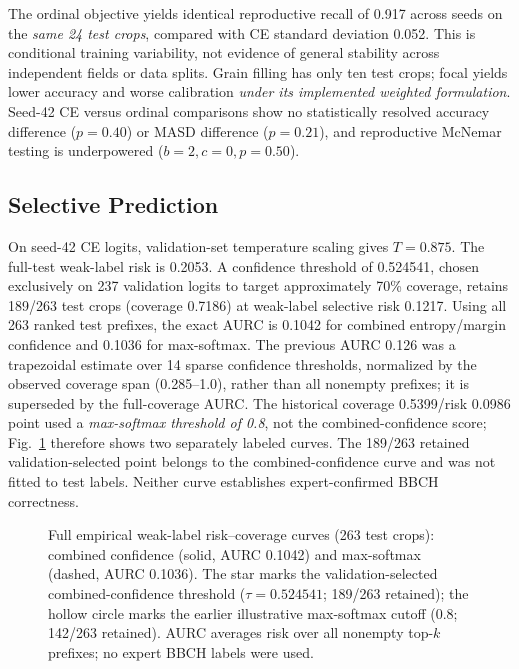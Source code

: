 \documentclass[conference,a4paper]{IEEEtran}
\begin{document}
The ordinal objective yields identical reproductive recall of 0.917 across seeds on the \emph{same 24 test crops}, compared with CE standard deviation 0.052. This is conditional training variability, not evidence of general stability across independent fields or data splits. Grain filling has only ten test crops; focal yields lower accuracy and worse calibration \emph{under its implemented weighted formulation}. Seed-42 CE versus ordinal comparisons show no statistically resolved accuracy difference ($p=0.40$) or MASD difference ($p=0.21$), and reproductive McNemar testing is underpowered ($b=2,c=0,p=0.50$).

\subsection{Selective Prediction}

On seed-42 CE logits, validation-set temperature scaling gives $T=0.875$. The full-test weak-label risk is 0.2053. A confidence threshold of 0.524541, chosen exclusively on 237 validation logits to target approximately 70\% coverage, retains 189/263 test crops (coverage 0.7186) at weak-label selective risk 0.1217. Using all 263 ranked test prefixes, the exact AURC is 0.1042 for combined entropy/margin confidence and 0.1036 for max-softmax. The previous AURC 0.126 was a trapezoidal estimate over 14 sparse confidence thresholds, normalized by the observed coverage span (0.285--1.0), rather than all nonempty prefixes; it is superseded by the full-coverage AURC. The historical coverage 0.5399/risk 0.0986 point used a \emph{max-softmax threshold of 0.8}, not the combined-confidence score; Fig.~\ref{fig:risk-coverage} therefore shows two separately labeled curves. The 189/263 retained validation-selected point belongs to the combined-confidence curve and was not fitted to test labels. Neither curve establishes expert-confirmed BBCH correctness.

\begin{figure}[t]
\centering
\resizebox{0.99\linewidth}{!}{}
\caption{Full empirical weak-label risk--coverage curves (263 test crops): combined confidence (solid, AURC 0.1042) and max-softmax (dashed, AURC 0.1036). The star marks the validation-selected combined-confidence threshold ($\tau=0.524541$; 189/263 retained); the hollow circle marks the earlier illustrative max-softmax cutoff (0.8; 142/263 retained). AURC averages risk over all nonempty top-$k$ prefixes; no expert BBCH labels were used.}
\label{fig:risk-coverage}
\end{figure}
\end{document}
